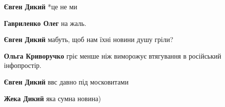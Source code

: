 \begin{itemize}
\begin{itemize}
\textbf{Євген Дикий} *це не ми

\begin{itemize}
 
\textbf{Гавриленко Олег} на жаль.
\end{itemize}

 
\textbf{Євген Дикий} мабуть, щоб нам їхні новини душу гріли?

\begin{itemize}
 
\textbf{Ольга Криворучко} гріє менше ніж виморожує втягування в російський інфопростір.
\end{itemize}

 
\textbf{Євген Дикий} ввс давно під московитами

 
\textbf{Жека Дикий} яка сумна новина)

\end{itemize}

 

\end{itemize}
